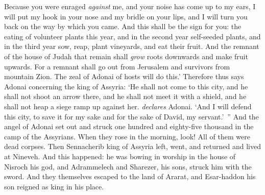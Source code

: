 \begin{biblechapter}
\verse Because you were enraged \textit{against} me, 
and your noise has come up to my ears, 
I will put my hook in your nose 
and my bridle on your lips, 
and I will turn you back 
on the way by which you came.
\verse And this shall be the sign for you: the eating of volunteer plants this year, and in the second year self-seeded plants, and in the third year sow, reap, plant vineyards, and eat their fruit.
\verse And the remnant of the house of Judah that remain shall \textit{grow} roots downwards and make fruit upwards.
\verse For a remnant shall go out from Jerusalem 
and survivors from mountain Zion. The zeal of Adonai of hosts will do this.’
\verse Therefore thus says Adonai concerning the king of Assyria:
\verse ‘He shall not come to this city, 
and he shall not shoot an arrow there, 
and he shall not meet it with a shield, 
and he shall not heap a siege ramp up against her. \textit{declares} Adonai.
\verse ‘And I will defend this city, to save it for my sake and for the sake of David, my servant.’ ”
 And the angel of Adonai set out and struck one hundred and eighty-five thousand in the camp of the Assyrians. When they rose in the morning, look! All of them were dead corpses.
\verse Then Sennacherib king of Assyria left, went, and returned and lived at Nineveh.
\verse And this happened: he was bowing in worship in the house of Nisroch his god, and Adrammelech and Sharezer, his sons, struck him with the sword. And they themselves escaped to the land of Ararat, and Esar-haddon his son reigned as king in his place.
\end{biblechapter}

